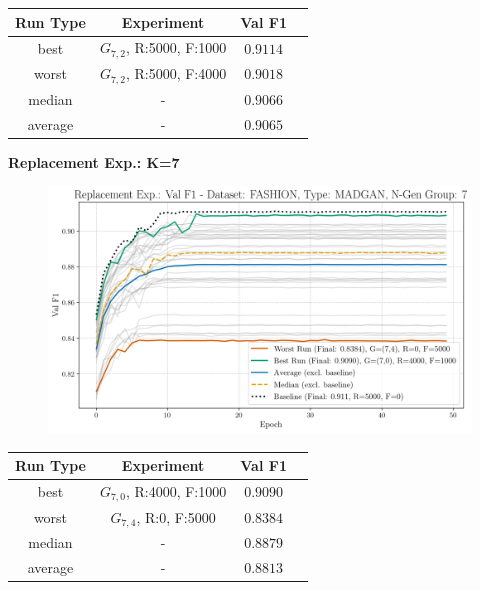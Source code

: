 \begin{table}[H]
	\vspace{-1em}
	\centering
	\begin{tabular}{|c|c|c|c|}
		\hline
		Run Type & Experiment & Val F1 \\ \hline
		best & \(G_{7, 2}\), R:5000, F:1000 & $0.9114$\\ \hline
		worst & \(G_{7, 2}\), R:5000, F:4000 & $0.9018$\\ \hline
		median & - & $0.9066$\\ \hline
		average & - & $0.9065$
		\\ \hline
	\end{tabular}
\end{table}
\noindent\textbf{Replacement Exp.: K=7}
\begin{figure}[htbp]
	\centering
	\includegraphics[width=.85\textwidth]{abb/strat_classifier_performance/FASHION_STRATIFIED_CLASSIFIERS_MADGAN_NEW/replacement_experiments/val_f1_score_MADGAN_FASHION_n_gen_7_all.png}
	\label{fig:app_strat_class_performance_replacement_exp._val_f1_score_7}
\end{figure}
\begin{table}[H]
	\vspace{-1em}
	\centering
	\begin{tabular}{|c|c|c|c|}
		\hline
		Run Type & Experiment & Val F1 \\ \hline
		best & \(G_{7, 0}\), R:4000, F:1000 & $0.9090$\\ \hline
		worst & \(G_{7, 4}\), R:0, F:5000 & $0.8384$\\ \hline
		median & - & $0.8879$\\ \hline
		average & - & $0.8813$
		\\ \hline
	\end{tabular}
\end{table}
